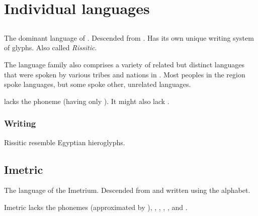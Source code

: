 \section{Individual languages}









\subsection{\Durcaci}
The dominant language of \Durcac. 
Descended from . 
Has its own unique writing system of glyphs. 
Also called \emph{Rissitic}. 

The \Durcaci language family also comprises a variety of related but distinct languages that were spoken by various tribes and nations in \Durcac. 
Most peoples in the region spoke \Durcaci languages, but some spoke other, unrelated languages. 

\Durcaci lacks the phoneme \txipa{[x]} (having only \txipa{[\c c]}). 
It might also lack \txipa{[l]}. 










\subsubsection{Writing}
Rissitic  resemble Egyptian hieroglyphs. 









\subsection{Imetric}
The language of the Imetrium. 
Descended from \Ortaican and written using the \Ortaican alphabet. 

Imetric lacks the phonemes \txipa{[b]} (approximated by \txipa{[v]}), \txipa{[T]}, \txipa{[x]}, \txipa{[\c c]}, \txipa{[S]}, \txipa{[z]} and \txipa{[Z]}. 




